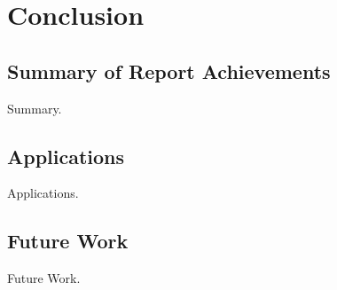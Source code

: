 
\chapter{Conclusion}

\label{ch:conclusions}

\section{Summary of Report Achievements}

Summary.


\section{Applications}

Applications.


\section{Future Work}

Future Work.
